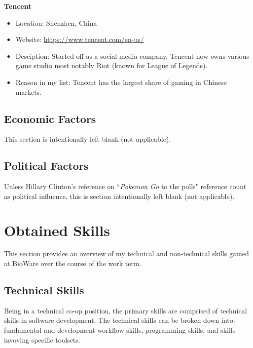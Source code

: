 \documentclass[10pt,letterpaper]{article}
\begin{document}
\textbf{Tencent}
\begin{itemize}
	\item Location: Shenzhen, China
	\item Website: \url{https://www.tencent.com/en-us/}
	\item Desciption: Started off as a social media company, Tencent now owns various game studio most notably Riot (known for League of Legends).
	\item Reason in my list: Tencent has the largest share of gaming in Chinese markets. 
\end{itemize}

\subsection{Economic Factors}

This section is intentionally left blank (not applicable).



\subsection{Political Factors}

Unless Hillary Clinton's reference on ``\textit{Pokemon Go} to the polls" reference count as political influence\cite{pokemon-go}, this is section intentionally left blank (not applicable).


\clearpage
\section{Obtained Skills}\label{obtained-skills}

This section provides an overview of my technical and non-technical skills gained at BioWare over the course of the work term. \\

\subsection{Technical Skills}

Being in a technical co-op position, the primary skills are comprised of technical skills in software development. The technical skills can be broken down into: fundamental and development workflow skills, programming skills, and skills invoving specific toolsets.\\
\end{document}

